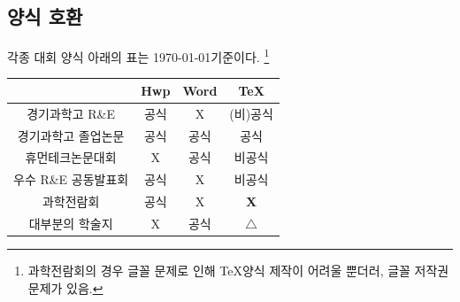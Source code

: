 \documentclass[12pt]{beamer}
\begin{document}
\subsection{양식 호환}
\begin{frame}{각종 대회 양식}
	아래의 표는 \today 기준이다. \footnote{과학전람회의 경우 글꼴 문제로 인해 \TeX 양식 제작이 어려울 뿐더러, 글꼴 저작권 문제가 있음.}
	\begin{footnotesize}
		\begin{table}
			\centering
			\begin{tabular}{|c|c|c|c|}
				\hline
				& Hwp & Word & TeX \\
				\hline
				\hline
				경기과학고 R\&E & 공식 & X & (비)공식 \\
				\hline
				경기과학고 졸업논문 & 공식 & 공식 & 공식 \\
				\hline
				휴먼테크논문대회 & X & 공식 & 비공식 \\
				\hline
				우수 R\&E 공동발표회 & 공식 & X & 비공식 \\
				\hline
				과학전람회 & 공식 & X & \textbf{X} \\
				\hline
				대부분의 학술지 & X & 공식 & $ \triangle $ \\
				\hline
			\end{tabular}
		\end{table}
	\end{footnotesize}
\end{frame}
\end{document}
